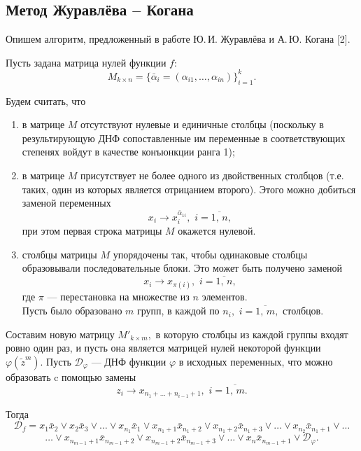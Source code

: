\documentclass[12pt,a4paper,oneside,fleqn,leqno]{article}
\theoremstyle{definition}
\begin{document}
		\subsection{Метод Журавлёва -- Когана} \label{zhuravlev_kogan}
			Опишем алгоритм, предложенный в работе Ю.\,И. Журавлёва и А.\,Ю. Когана [2].\par
			Пусть задана матрица нулей функции $f$:
			$$
				M_{k \times n} = \{\bar{\alpha}_i = (\alpha_{i1},\ldots,\alpha_{in}) \}_{i = 1}^k.
			$$\par
			Будем считать, что
			\begin{enumerate}
				\item
				в матрице $M$ отсутствуют нулевые и единичные столбцы (поскольку в результирующую ДНФ сопоставленные им переменные в соответствующих степенях войдут в качестве конъюнкции ранга 1);
				\item
				в матрице $M$ присутствует не более одного из двойственных столбцов (т.е. таких, один из которых является отрицанием второго). Этого можно добиться заменой переменных
				$$
					x_i \rightarrow x_i^{\bar{\alpha}_{1i}},\,\,i = \overline{1,\,n},
				$$
				при этом первая строка матрицы $M$ окажется нулевой.
				\item
				столбцы матрицы $M$ упорядочены так, чтобы одинаковые столбцы образовывали последовательные блоки. Это может быть получено заменой
					$$
					x_i \rightarrow x_{\pi(i)},\,\,i = \overline{1,\,n},
				$$
				где $\pi$ --- перестановка на множестве из $n$ элементов.\\
				Пусть было образовано $m$ групп, в каждой по $n_i,\,\,i = \overline{1,\,m},$ столбцов.
			\end{enumerate}\par
			Составим новую матрицу $M'_{k \times m},$ в которую столбцы из каждой группы входят ровно один раз, и пусть она является матрицей нулей некоторой функции $\varphi(\tilde z^m).$ Пусть $\mathcal{D}_{\varphi}$ --- ДНФ функции $\varphi$ в исходных переменных, что можно образовать c помощью замены
			$$
				z_i \rightarrow x_{n_1 + \ldots + n_{i - 1} + 1},\,\,i = \overline{1,\,m}.
			$$\par
			Тогда
			$$
				\mathcal{D}_f = x_1\bar{x}_2 \vee x_2\bar{x}_3 \vee \ldots \vee x_{n_1}\bar{x}_1 \vee x_{n_1 + 1}\bar{x}_{n_1 + 2} \vee x_{n_1 + 2}\bar{x}_{n_1 + 3} \vee \ldots \vee x_{n_2}\bar{x}_{n_1 + 1} \vee \ldots
			$$
			$$
				\ldots \vee x_{n_{m - 1} + 1}\bar{x}_{n_{m - 1} + 2} \vee x_{n_{m - 1} + 2}\bar{x}_{n_{m - 1} + 3} \vee \ldots \vee x_{n}\bar{x}_{n_{m - 1} + 1} \vee \mathcal{D}_{\varphi}.
			$$\par
\end{document}

